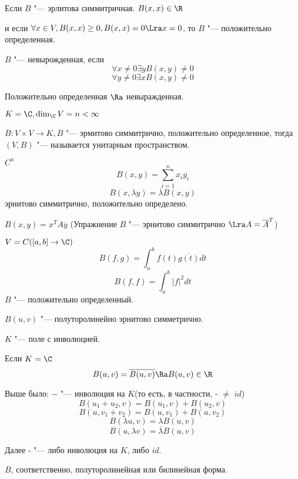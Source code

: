 \begin{Def}
Если $B$ "--- эрлитова симмитричная.
$B(x, x) \in \R$

и если $\forall x \in V, B(x, x) \ge 0, B(x, x) = 0 \Lra x = 0$, то $B$ "--- 
положительно определенная. 
\end{Def}



\begin{Def}
$B$ "--- невырожденная, если 
$$\forall x \ne 0 \exists y B(x, y) \ne 0$$
$$\forall y \ne 0 \exists x B(x, y) \ne 0$$
\end{Def}

Положительно определенная $\Ra$ невыражденная.
\begin{Def}
$K = \C, \dim_{\C}V = n < \infty$

$B \colon V \times V \to K, B$ "--- эрмитово симмитрично, положительно определенное,
тогда $(V, B)$ "--- называется унитарным пространством. 
\end{Def}

\begin{exmp}
\item $C^n$
 $$B(x, y) = \sum_{i = 1}^{n}x_i\overline{y_i}$$
 $$B(x, \lambda y) = \overline{\lambda}B(x, y)$$
 эрнитово симмитрично, положительно определено.
\item $B(x, y) = x^{T}A\overline{y}$
(Упражнение $B$ "--- эрнитово  симмитрично $\Lra A  = \overline{A}^{T}$)
\item $V = C([a, b] \to \C)$
$$B(f, g) = \int_{a}^{b}f(t)\overline{g(t)}dt$$  
$$B(f, f) = \int_{a}^{b}|f|^2dt$$
$B$ "--- положительно определенный. 
\end{exmp}

$B(u, v)$ "--- полуторолинейно эрнитово симметрично.

$K$ "--- поле с инволюцией.

Если $K = \C$
$$B(u, v) = \overline{B(u, v)} \Ra B(u, v) \in \R$$ 

Выше было: $-$ "--- инволюция на $K$(то есть, в частности, - $\ne$ $id$)
$$B(u_1 + u_2, v) = B(u_1, v) + B(u_2, v)$$
$$B(u, v_1 + v_2) = B(u, v_1) + B(u, v_2)$$
$$B(\lambda u, v) = \lambda B(u, v)$$
$$B(u, \lambda v) = \overline{\lambda} B(u, v)$$

Далее - "--- либо инволюция на $K$, либо $id$.

$B$, соответственно, полуторолинейная или билинейная форма.